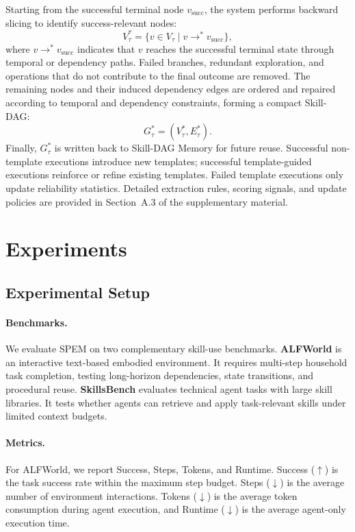 \documentclass[letterpaper]{article} %
\newcommand{\model}{\textsc{SPEM}}
\begin{document}
Starting from the successful terminal node $v_{\mathrm{succ}}$, the system performs backward slicing to identify success-relevant nodes:
\begin{equation}
V^{*}_{\tau}=\{v \in V_{\tau} \mid v \to^{*} v_{\mathrm{succ}}\},
\end{equation}
where $v \to^{*} v_{\mathrm{succ}}$ indicates that $v$ reaches the successful terminal state through temporal or dependency paths. Failed branches, redundant exploration, and operations that do not contribute to the final outcome are removed. The remaining nodes and their induced dependency edges are ordered and repaired according to temporal and dependency constraints, forming a compact Skill-DAG:
\begin{equation}
G^{*}_{\tau}=(V^{*}_{\tau},E^{*}_{\tau}).
\end{equation}
Finally, $G^{*}_{\tau}$ is written back to Skill-DAG Memory for future reuse. Successful non-template executions introduce new templates; successful template-guided executions reinforce or refine existing templates. Failed template executions only update reliability statistics. Detailed extraction rules, scoring signals, and update policies are provided in Section~A.3 of the supplementary material.

\section{Experiments}

\subsection{Experimental Setup}

\paragraph{Benchmarks.}
We evaluate \model{} on two complementary skill-use benchmarks.
\textbf{ALFWorld} \cite{shridhar2020alfworld} is an interactive text-based embodied environment. It requires multi-step household task completion, testing long-horizon dependencies, state transitions, and procedural reuse.
\textbf{SkillsBench} \cite{li2026skillsbench} evaluates technical agent tasks with large skill libraries. It tests whether agents can retrieve and apply task-relevant skills under limited context budgets.

\paragraph{Metrics.}
For ALFWorld, we report Success, Steps, Tokens, and Runtime.
Success ($\uparrow$) is the task success rate within the maximum step budget. Steps ($\downarrow$) is the average number of environment interactions. Tokens ($\downarrow$) is the average token consumption during agent execution, and Runtime ($\downarrow$) is the average agent-only execution time.
\end{document}
